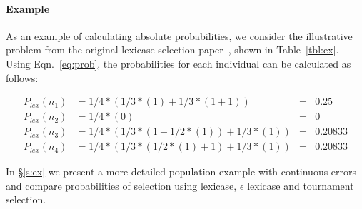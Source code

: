 \documentclass[twoside]{article}
\begin{document}
\paragraph{Example}
As an example of calculating absolute probabilities, we consider the illustrative problem from the original lexicase selection paper~\citep{spector_assessment_2012}, shown in Table~\ref{tbl:ex}. Using Eqn.~\ref{eq:prob}, the probabilities for each individual can be calculated as follows:

\begin{align*}
P_{lex}(n_1)& = 1/4*(1/3*(1)+1/3*(1+1)) &=& 0.25 \\
P_{lex}(n_2)& = 1/4*(0) &=& 0 \\
P_{lex}(n_3)& =1/4*(1/3*(1+1/2*(1))+1/3*(1)) &=& 0.20833 \\
P_{lex}(n_4)& = 1/4*(1/3*(1/2*(1)+1)+1/3*(1)) &=& 0.20833 
\end{align*}


In \S\ref{s:ex} we present a more detailed population example with continuous errors and compare probabilities of selection using lexicase, $\epsilon$ lexicase and tournament selection. 
 

\end{document}
